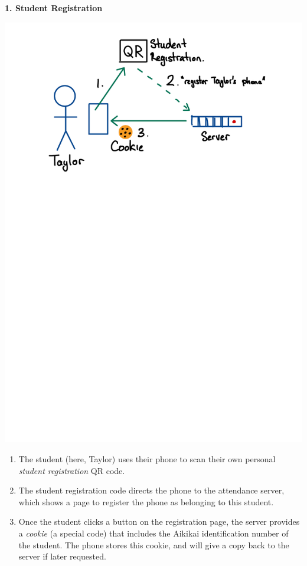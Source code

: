 \begin{minipage}[t]{\dimexpr0.5\linewidth-1em}
\textbf{1. Student Registration}
\begin{center}
\includegraphics[scale=0.4]{figure/fig-student-registration.pdf}
\end{center}

\begin{enumerate}
\item The student (here, Taylor) uses their phone to scan their
      own personal \emph{student registration} QR code.

\item The student registration code directs the phone to the
      attendance server, which shows a page to register the phone
      as belonging to this student.

\item Once the student clicks a button on the registration page,
      the server provides a \emph{cookie} (a special code) that includes
      the Aikikai identification number of the student. The phone stores
      this cookie, and will give a copy back to the server if later requested.
\end{enumerate}


\end{minipage}
